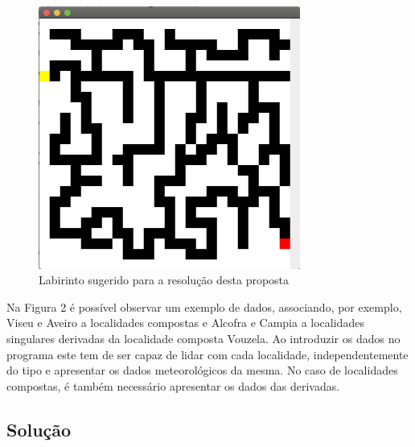 \documentclass[10pt,portuguese]{article}
\begin{document}
\begin{figure}[!h]
    \centering
    \includegraphics[width=325]{images/command/labirinto.png}
    \caption{Labirinto sugerido para a resolução desta proposta}
\end{figure}

\par Na Figura 2 é possível observar um exemplo de dados, associando, por exemplo, Viseu e Aveiro a localidades compostas e Alcofra e Campia a localidades singulares derivadas da localidade composta Vouzela. Ao introduzir os dados no programa este tem de ser capaz de lidar com cada localidade, independentemente do tipo e apresentar os dados meteorológicos da mesma. No caso de localidades compostas, é também necessário apresentar os dados das derivadas.


\subsection{Solução}
\end{document}
